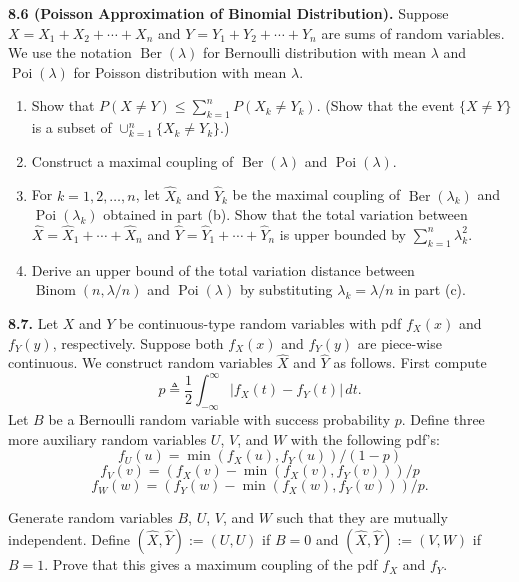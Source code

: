 \textbf{8.6 (Poisson Approximation of Binomial Distribution).} Suppose $X=X_1+X_2+\cdots+X_n$ and $Y=Y_1+Y_2+\cdots+Y_n$ are sums of random variables. We use the notation $\operatorname{Ber}(\lambda)$ for Bernoulli distribution with mean $\lambda$ and $\operatorname{Poi}(\lambda)$ for Poisson distribution with mean $\lambda$.
\begin{enumerate}[label=(\alph*)]
    \item Show that $P(X\neq Y)\le \sum_{k=1}^{n} P(X_k\neq Y_k)$. (Show that the event $\{X\neq Y\}$ is a subset of $\cup_{k=1}^{n}\{X_k\neq Y_k\}$.)
    \item Construct a maximal coupling of $\operatorname{Ber}(\lambda)$ and $\operatorname{Poi}(\lambda)$.
    \item For $k=1,2,\dots,n$, let $\hat{X}_k$ and $\hat{Y}_k$ be the maximal coupling of $\operatorname{Ber}(\lambda_k)$ and $\operatorname{Poi}(\lambda_k)$ obtained in part (b). Show that the total variation between $\hat{X}=\hat{X}_1+\cdots+\hat{X}_n$ and $\hat{Y}=\hat{Y}_1+\cdots+\hat{Y}_n$ is upper bounded by $\sum_{k=1}^{n} \lambda_k^2$.
    \item Derive an upper bound of the total variation distance between $\operatorname{Binom}(n,\lambda/n)$ and $\operatorname{Poi}(\lambda)$ by substituting $\lambda_k=\lambda/n$ in part (c).
\end{enumerate}

\textbf{8.7.} Let $X$ and $Y$ be continuous-type random variables with pdf $f_X(x)$ and $f_Y(y)$, respectively. Suppose both $f_X(x)$ and $f_Y(y)$ are piece-wise continuous. We construct random variables $\hat{X}$ and $\hat{Y}$ as follows. First compute
\[
p \triangleq \frac{1}{2}\int_{-\infty}^{\infty} |f_X(t)-f_Y(t)|\, dt.
\]
Let $B$ be a Bernoulli random variable with success probability $p$. Define three more auxiliary random variables $U$, $V$, and $W$ with the following pdf's:
\[
f_U(u)=\min(f_X(u),f_Y(u))/(1-p)
\]
\[
f_V(v)=(f_X(v)-\min(f_X(v),f_Y(v)))/p
\]
\[
f_W(w)=(f_Y(w)-\min(f_X(w),f_Y(w)))/p.
\]

Generate random variables $B$, $U$, $V$, and $W$ such that they are mutually independent. Define $(\hat{X},\hat{Y}):=(U,U)$ if $B=0$ and $(\hat{X},\hat{Y}):=(V,W)$ if $B=1$. Prove that this gives a maximum coupling of the pdf $f_X$ and $f_Y$.
